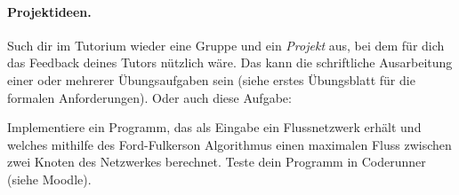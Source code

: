 \documentclass{uebung_cs}
\begin{document}
\paragraph*{Projektideen.}
Such dir im Tutorium wieder eine Gruppe und ein \emph{Projekt} aus, bei dem für dich das Feedback deines Tutors nützlich wäre.
Das kann die schriftliche Ausarbeitung einer oder mehrerer Übungsaufgaben sein (siehe erstes Übungsblatt für die formalen Anforderungen). Oder auch diese Aufgabe:

\begin{exercise}
    Implementiere ein Programm, das als Eingabe ein Flussnetzwerk erhält und welches mithilfe des Ford-Fulkerson Algorithmus einen maximalen Fluss zwischen zwei Knoten des Netzwerkes berechnet.
    Teste dein Programm in Coderunner (siehe {Moodle}).
\end{exercise}
\end{document}
